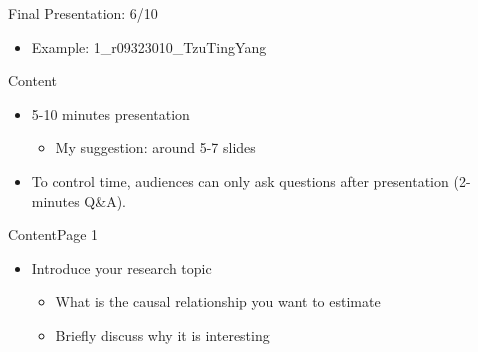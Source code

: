 \documentclass[dvipsnames,hyperref={pdfpagelabels=false}]{beamer}
\begin{document}
\begin{frame}{Final Presentation: 6/10}
\begin{itemize}
\begin{itemize}
	   	\vspace{0.2cm}
	   	\item Example: 1\_r09323010\_TzuTingYang
	   		   	\vspace{0.2cm}
	   \end{itemize}
	\end{itemize}
\end{frame}




\begin{frame}{Content}
\begin{itemize} 
	\item  5-10 minutes presentation
	\vspace{0.2cm}
	\begin{itemize} 
		\item My suggestion: around 5-7 slides
		\vspace{0.2cm}
	\end{itemize}
	\item To control time, audiences can only ask questions after presentation (2-minutes Q\&A).
	\vspace{0.2cm}
	
\end{itemize}
\end{frame}




\begin{frame}{Content}{Page 1}
	\begin{itemize} 
		\item Introduce your research topic 
		\vspace{0.2cm}
		\begin{itemize}
			\item What is the causal relationship you want to estimate
			\vspace{0.2cm}
			\item Briefly discuss why it is interesting
	\end{itemize}
	\end{itemize}
\end{frame}
\end{document}
